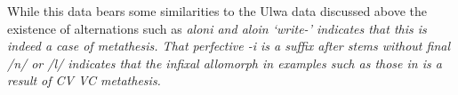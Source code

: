 While this data bears some similarities to the Ulwa data
discussed above the existence of alternations
such as \it{aloni} and \it{aloin} `write-'
indicates that this is indeed a case of metathesis.
That perfective \it{-i} is a suffix
after stems without final /n/ or /l/ indicates
that the infixal allomorph in examples such as those in 
is a result of CV {\ra} VC metathesis.
